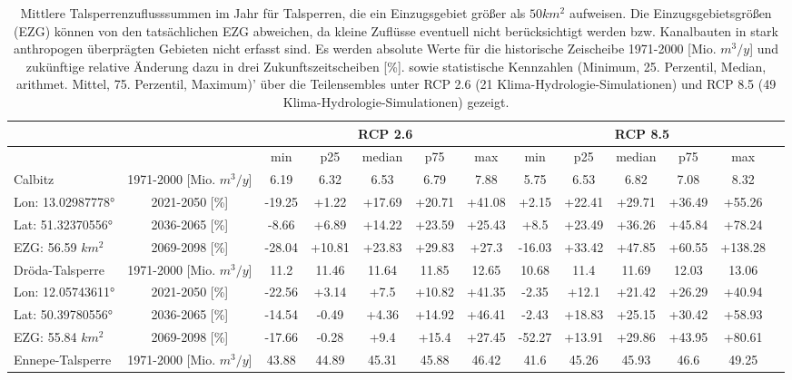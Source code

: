 \renewcommand{\arraystretch}{1.2}
\addtolength{\tabcolsep}{-5.9pt}
\scriptsize
\begin{longtable}{@{\extracolsep{\fill}}lc|ccccc||cccccc}
\caption{Mittlere Talsperrenzuflusssummen im Jahr für Talsperren, die ein Einzugsgebiet größer als $50 km^2$ aufweisen. Die Einzugsgebietsgrößen (EZG) können von den tatsächlichen EZG abweichen, da kleine Zuflüsse eventuell nicht berücksichtigt werden bzw. Kanalbauten in stark anthropogen überprägten Gebieten nicht erfasst sind. Es werden absolute Werte für die historische Zeischeibe 1971-2000 [Mio. $m^3/y$] und zukünftige relative Änderung dazu in drei Zukunftszeitscheiben [\%]. sowie statistische Kennzahlen (Minimum, 25. Perzentil, Median, arithmet. Mittel, 75. Perzentil, Maximum)' über die Teilensembles unter RCP 2.6 (21 Klima-Hydrologie-Simulationen) und RCP 8.5 (49 Klima-Hydrologie-Simulationen) gezeigt.}\\  \hline
\multicolumn{2}{c}{} & \multicolumn{5}{c||}{RCP 2.6}  & \multicolumn{5}{c}{RCP 8.5}\\ \hline
\multicolumn{2}{c|}{} & min & p25 & median & p75 & max & min & p25 & median & p75 & max\\ 
\hline 
Calbitz & 1971-2000 [Mio. $m^3/y$]  & 6.19 & 6.32 & 6.53 & 6.79 & 7.88 & 5.75 & 6.53 & 6.82 & 7.08 & 8.32\\ 
\cline{2-12} 
Lon: 13.02987778° & 2021-2050 [\%]  & -19.25 & +1.22 & +17.69 & +20.71 & +41.08 & +2.15 & +22.41 & +29.71 & +36.49 & +55.26\\ 
Lat: 51.32370556° & 2036-2065 [\%]  & -8.66 & +6.89 & +14.22 & +23.59 & +25.43 & +8.5 & +23.49 & +36.26 & +45.84 & +78.24\\ 
EZG: 56.59 $km^2$ & 2069-2098 [\%]  & -28.04 & +10.81 & +23.83 & +29.83 & +27.3 & -16.03 & +33.42 & +47.85 & +60.55 & +138.28\\ 
\hline 
Dröda-Talsperre & 1971-2000 [Mio. $m^3/y$]  & 11.2 & 11.46 & 11.64 & 11.85 & 12.65 & 10.68 & 11.4 & 11.69 & 12.03 & 13.06\\ 
\cline{2-12} 
Lon: 12.05743611° & 2021-2050 [\%]  & -22.56 & +3.14 & +7.5 & +10.82 & +41.35 & -2.35 & +12.1 & +21.42 & +26.29 & +40.94\\ 
Lat: 50.39780556° & 2036-2065 [\%]  & -14.54 & -0.49 & +4.36 & +14.92 & +46.41 & -2.43 & +18.83 & +25.15 & +30.42 & +58.93\\ 
EZG: 55.84 $km^2$ & 2069-2098 [\%]  & -17.66 & -0.28 & +9.4 & +15.4 & +27.45 & -52.27 & +13.91 & +29.86 & +43.95 & +80.61\\ 
\hline 
Ennepe-Talsperre & 1971-2000 [Mio. $m^3/y$]  & 43.88 & 44.89 & 45.31 & 45.88 & 46.42 & 41.6 & 45.26 & 45.93 & 46.6 & 49.25\\ 

\end{longtable}
